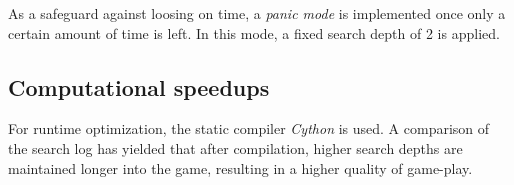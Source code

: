 As a safeguard against loosing on time, a \textit{panic mode} is implemented once only a certain amount of time is left. In this mode, a fixed search depth of 2 is applied.

\subsection{Computational speedups}
For runtime optimization, the static compiler \textit{Cython} is used. A comparison of the search log has yielded that after compilation, higher search depths are maintained longer into the game, resulting in a higher quality of game-play.